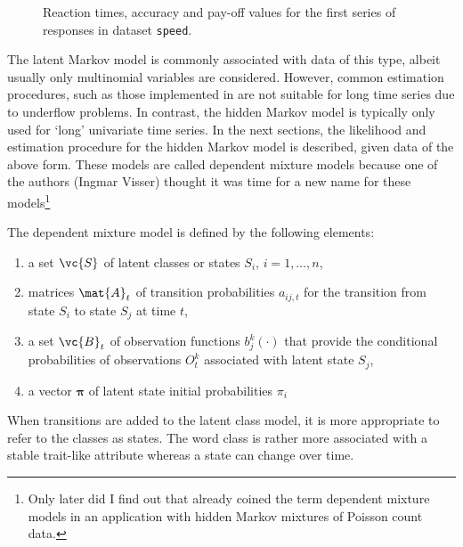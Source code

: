 \documentclass[article]{jss}
\begin{document}
\begin{figure}[htbp]
  \begin{center}
	  \caption{Reaction times, accuracy and pay-off values for
	  the first series of responses in dataset \texttt{speed}.}
	  \label{fig:speed}
  \end{center}
\end{figure}

The latent Markov model is commonly associated with data of this type,
albeit usually only multinomial variables are considered.  However,
common estimation procedures, such as those implemented in
\citet{Pol1996} are not suitable for long time series due to underflow
problems.  In contrast, the hidden Markov model is typically only used
for `long' univariate time series.  In the next sections, the
likelihood and estimation procedure for the hidden Markov model is
described, given data of the above form.  These models are called
dependent mixture models because one of the authors (Ingmar Visser)
thought it was time for a new name for these models\footnote{Only later 
did I find out that \citet{Leroux1992} already coined the term dependent 
mixture models in an application with hidden Markov mixtures of Poisson 
count data.}

The dependent mixture model is defined by the following elements:
\begin{enumerate}
	
	\item a set $\vc{S}$ of latent classes or states $S_{i},\, i=1,
	\ldots , n$,
	
	\item matrices $\mat{A}_t$ of transition probabilities $a_{ij,t}$ for
	the transition from state $S_{i}$ to state $S_{j}$ at time $t$,
	
	\item a set $\vc{B}_t$ of observation functions $b_j^k(\cdot)$ that
	provide the conditional probabilities of observations $O_{t}^k$ 
	associated with latent state $S_{j}$,
	
	\item a vector $\pmb{\pi}$ of latent state initial probabilities
	$\pi_{i}$
\end{enumerate}
When transitions are added to the latent class model, it is more 
appropriate to refer to the classes as states. The word class is 
rather more associated with a stable trait-like attribute whereas a 
state can change over time. 
\end{document}
